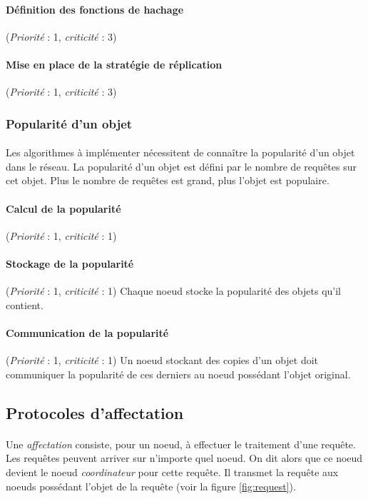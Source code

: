 \documentclass[12pt]{article}
\newcommand{\besoin}[2] {
  (\textit{Priorité} : #1, \textit{criticité} : #2)
}
\begin{document}
\paragraph{Définition des fonctions de hachage} \besoin{1}{3}
\paragraph{Mise en place de la stratégie de réplication} \besoin{1}{3}


\subsubsection{Popularité d'un objet}

\paragraph{} Les algorithmes à implémenter nécessitent de connaître la popularité d'un objet dans le réseau.
La popularité d'un objet est défini par le nombre de requêtes sur cet objet.
Plus le nombre de requêtes est grand, plus l'objet est populaire.

\paragraph{Calcul de la popularité} \besoin{1}{1}

\paragraph{Stockage de la popularité} \besoin{1}{1} Chaque noeud stocke la popularité des objets qu'il contient.

\paragraph{Communication de la popularité} \besoin{1}{1} Un noeud stockant des copies d'un objet doit communiquer la popularité de ces derniers au noeud possédant l'objet original.


\subsection{Protocoles d'affectation}

\paragraph{} Une \textit{affectation} consiste, pour un noeud, à effectuer le traitement d'une requête. Les requêtes peuvent arriver sur n'importe quel noeud. On dit alors que ce noeud devient le noeud \textit{coordinateur} pour cette requête. Il transmet la requête aux noeuds possédant l'objet de la requête (voir la figure \ref{fig:request}).
\end{document}
